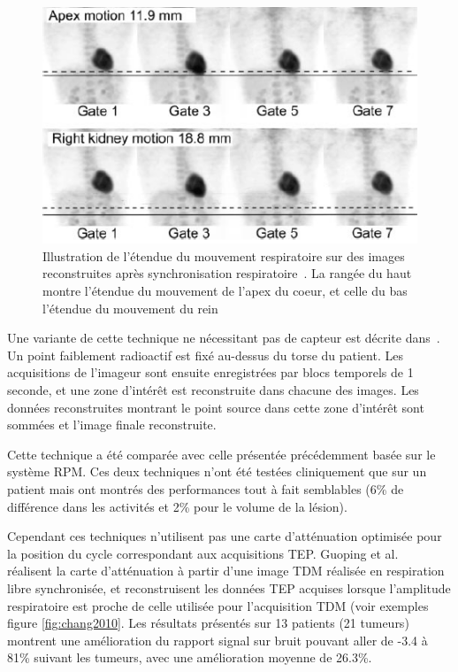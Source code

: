 \begin{figure}[h!]
	\begin{center}
		\includegraphics[width=12cm]{images/gatingBoucher2004}
	\end{center}
	\caption{Illustration de l'étendue du mouvement respiratoire sur des images reconstruites après synchronisation respiratoire~\cite{boucher2004respiratory}. La rangée du haut montre l'étendue du mouvement de l'apex du coeur, et celle du bas l'étendue du mouvement du rein} 
	\label{fig:boucher2004}
\end{figure}

Une variante de cette technique ne nécessitant pas de capteur est décrite dans~\cite{nehmeh2003reduction}. Un point faiblement radioactif est fixé au-dessus du torse du patient. Les acquisitions de l'imageur sont ensuite enregistrées par blocs temporels de 1 seconde, et une zone d'intérêt est reconstruite dans chacune des images. Les données reconstruites montrant le point source dans cette zone d'intérêt sont sommées et l'image finale reconstruite. 

Cette technique a été comparée avec celle présentée précédemment basée sur le système RPM. Ces deux techniques n'ont été testées cliniquement que sur un patient mais ont montrés des performances tout à fait semblables (6\% de différence dans les activités et 2\% pour le volume de la lésion).

Cependant ces techniques n'utilisent pas une carte d'atténuation optimisée pour la position du cycle correspondant aux acquisitions TEP.  Guoping et al.~\cite{GuopingChang2010Implementation} réalisent la carte d'atténuation à partir d'une image TDM réalisée en respiration libre synchronisée, et reconstruisent les données TEP acquises lorsque l'amplitude respiratoire est proche de celle utilisée pour l'acquisition TDM (voir exemples figure \ref{fig:chang2010}. Les résultats présentés sur 13 patients (21 tumeurs) montrent une amélioration du rapport signal sur bruit pouvant aller de -3.4 à 81\% suivant les tumeurs, avec une amélioration moyenne de 26.3\%.

